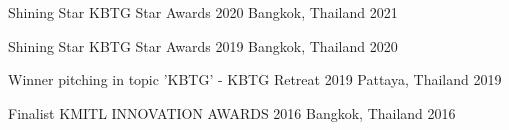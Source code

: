 


\begin{cvhonors}


  \cvhonor
  {Shining Star} %
  {KBTG Star Awards 2020} %
  {Bangkok, Thailand} %
  {2021} %


  \cvhonor
    {Shining Star} %
    {KBTG Star Awards 2019} %
    {Bangkok, Thailand} %
    {2020} %


  \cvhonor
    {Winner} %
    {pitching in topic 'KBTG' - KBTG Retreat 2019} %
    {Pattaya, Thailand} %
    {2019} %


  \cvhonor
    {Finalist} %
    {KMITL INNOVATION AWARDS 2016} %
    {Bangkok, Thailand} %
    {2016} %

\end{cvhonors}
